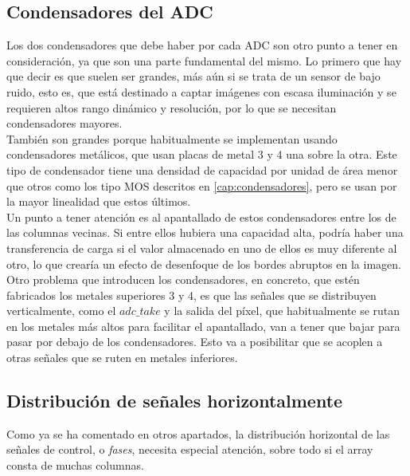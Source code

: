 \subsection{Condensadores del ADC}

Los dos condensadores que debe haber por cada ADC son otro punto a tener en
consideración, ya que son una parte fundamental del mismo. Lo primero que
hay que decir es que suelen ser grandes, más aún si se trata de un sensor de
bajo ruido, esto es, que está destinado a captar imágenes con escasa iluminación
y se requieren altos rango dinámico y resolución, por lo que se necesitan condensadores
mayores.\\

También son grandes porque habitualmente se implementan usando condensadores
metálicos, que usan placas de metal 3 y 4 una sobre la otra. Este tipo de condensador
tiene una densidad de capacidad por unidad de área menor que otros como los tipo
MOS descritos en \ref{cap:condensadores}, pero se usan por la mayor linealidad que
estos últimos.\\

Un punto a tener atención es al apantallado de estos condensadores entre los de
las columnas vecinas. Si entre ellos hubiera una capacidad alta, podría haber
una transferencia de carga si el valor almacenado en uno de ellos es muy diferente
al otro, lo que crearía un efecto de desenfoque de los bordes abruptos en la imagen.\\

Otro problema que introducen los condensadores, en concreto, que estén fabricados
los metales superiores 3 y 4, es que las señales que se distribuyen verticalmente,
como el $adc\_take$ y la salida del píxel, que habitualmente se rutan en los metales
más altos para facilitar el apantallado, van a tener que bajar para pasar por debajo
de los condensadores. Esto va a posibilitar que se acoplen a otras señales que se ruten
en metales inferiores.\\

\subsection{Distribución de señales horizontalmente}

Como ya se ha comentado en otros apartados, la distribución horizontal de las
señales de control, o \textit{fases}, necesita especial atención, sobre todo
si el array consta de muchas columnas.\\

